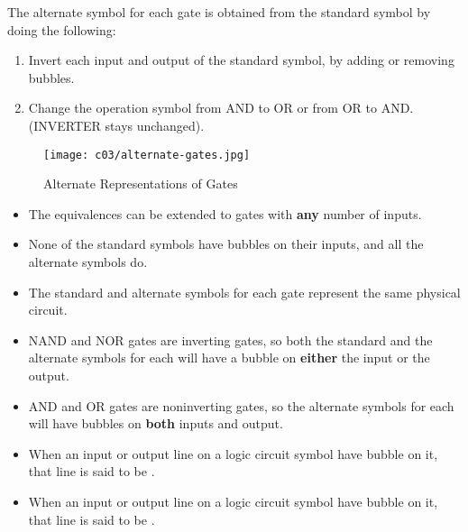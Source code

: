     \par The alternate symbol for each gate is obtained from the standard
    symbol by doing the following:
    \begin{enumerate}
      \item Invert each input and output of the standard symbol, by adding or
        removing bubbles.
      \item Change the operation symbol from AND to OR or from OR to AND.
        (INVERTER stays unchanged).
    \end{enumerate}
    \begin{figure}[H]
      \texttt{[image: c03/alternate-gates.jpg]}
      \caption{Alternate Representations of Gates}
    \end{figure}
    \begin{itemize}
      \item The equivalences can be extended to gates with \textbf{any}
        number of inputs.
      \item None of the standard symbols have bubbles on their inputs, and
        all the alternate symbols do.
      \item The standard and alternate symbols for each gate represent the
        same physical circuit.
      \item NAND and NOR gates are inverting gates, so both the standard and
        the alternate symbols for each will have a bubble on \textbf{either}
        the input or the output.
      \item AND and OR gates are noninverting gates, so the alternate symbols
        for each will have bubbles on \textbf{both} inputs and output.
    \end{itemize}

    \begin{itemize}
      \item When an input or output line on a logic circuit symbol  have bubble on it, that line is said to be .
      \item When an input or output line on a logic circuit symbol 
        have bubble on it, that line is said to be .
    \end{itemize}

